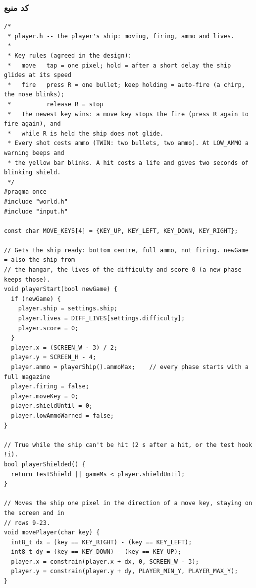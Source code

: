 \documentclass[11pt,a4paper]{article}
\begin{document}
\subsubsection*{کد منبع}
\begin{latin}
\begin{lstlisting}[language=Arduino]
/*
 * player.h -- the player's ship: moving, firing, ammo and lives.
 *
 * Key rules (agreed in the design):
 *   move   tap = one pixel; hold = after a short delay the ship glides at its speed
 *   fire   press R = one bullet; keep holding = auto-fire (a chirp, the nose blinks);
 *          release R = stop
 *   The newest key wins: a move key stops the fire (press R again to fire again), and
 *   while R is held the ship does not glide.
 * Every shot costs ammo (TWIN: two bullets, two ammo). At LOW_AMMO a warning beeps and
 * the yellow bar blinks. A hit costs a life and gives two seconds of blinking shield.
 */
#pragma once
#include "world.h"
#include "input.h"

const char MOVE_KEYS[4] = {KEY_UP, KEY_LEFT, KEY_DOWN, KEY_RIGHT};

// Gets the ship ready: bottom centre, full ammo, not firing. newGame = also the ship from
// the hangar, the lives of the difficulty and score 0 (a new phase keeps those).
void playerStart(bool newGame) {
  if (newGame) {
    player.ship = settings.ship;
    player.lives = DIFF_LIVES[settings.difficulty];
    player.score = 0;
  }
  player.x = (SCREEN_W - 3) / 2;
  player.y = SCREEN_H - 4;
  player.ammo = playerShip().ammoMax;    // every phase starts with a full magazine
  player.firing = false;
  player.moveKey = 0;
  player.shieldUntil = 0;
  player.lowAmmoWarned = false;
}

// True while the ship can't be hit (2 s after a hit, or the test hook !i).
bool playerShielded() {
  return testShield || gameMs < player.shieldUntil;
}

// Moves the ship one pixel in the direction of a move key, staying on the screen and in
// rows 9-23.
void movePlayer(char key) {
  int8_t dx = (key == KEY_RIGHT) - (key == KEY_LEFT);
  int8_t dy = (key == KEY_DOWN) - (key == KEY_UP);
  player.x = constrain(player.x + dx, 0, SCREEN_W - 3);
  player.y = constrain(player.y + dy, PLAYER_MIN_Y, PLAYER_MAX_Y);
}


\end{lstlisting}
\end{latin}
\end{document}
